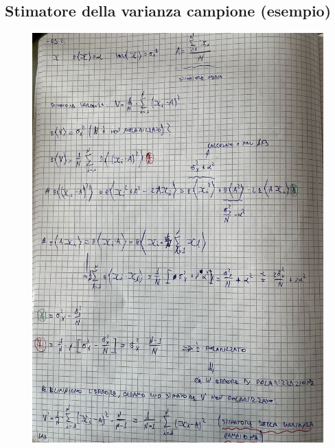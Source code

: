 \documentclass{article}
\begin{document}
\subsection{Stimatore della varianza campione (esempio)}
\begin{figure}[H]
\centering
\includegraphics[scale=0.16]{ese/54.jpeg}
\end{figure}
\end{document}
